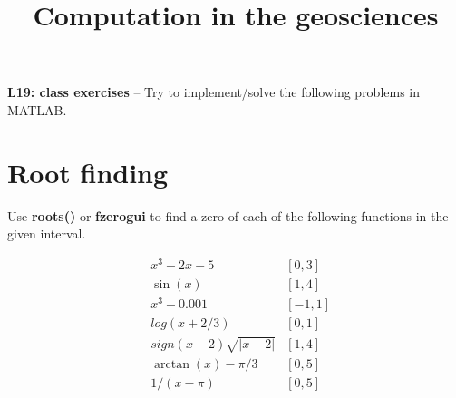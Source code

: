 \documentclass[10pt,fleqn]{article}
\title{Computation in the geosciences}
\date{\empty}
\begin{document}
\textbf{L19: class exercises} -- Try to implement/solve the following problems in MATLAB.

\section*{Root finding}

Use \textbf{roots()} or \textbf{fzerogui} to find a zero of each of the following functions in the given interval. 

\begin{eqnarray} \nonumber
& x^3 - 2x - 5 & [0,3] \\ \nonumber
& \sin(x) & [1,4]  \\ \nonumber
& x^3 - 0.001 & [-1,1] \\ \nonumber
& log(x+2/3) & [0,1] \\ \nonumber
& sign(x-2)\sqrt{|x-2|} & [1,4] \\ \nonumber
& \arctan(x) - \pi/3 & [0,5] \\ \nonumber
& 1/(x-\pi) & [0,5] \\ \nonumber
\end{eqnarray}
\end{document}
